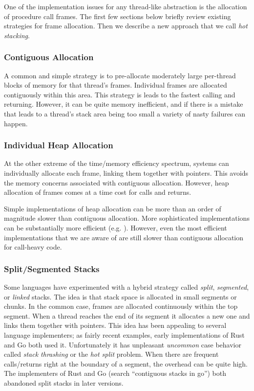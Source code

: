 \documentclass[acmsmall,anonymous,review]{acmart}\settopmatter{printfolios=true,printccs=false,printacmref=false}
\begin{document}
One of the implementation issues for any thread-like abstraction is the allocation of procedure call frames.
The first few sections below briefly review existing strategies for frame allocation.
Then we describe a new approach that we call \emph{hot stacking}.

\subsubsection{Contiguous Allocation}

A common and simple strategy is to pre-allocate moderately large per-thread blocks of memory for that thread's frames.
Individual frames are allocated contiguously within this area.
This strategy is leads to the fastest calling and returning.
However, it can be quite memory inefficient, and if there is a mistake that leads to a thread's stack area being too small a variety of nasty failures can happen.

\subsubsection{Individual Heap Allocation}

At the other extreme of the time/memory efficiency spectrum, systems can individually allocate each frame, linking them together with pointers.
This avoids the memory concerns associated with contiguous allocation.
However, heap allocation of frames comes at a time cost for calls and returns.

Simple implementations of heap allocation can be more than an order of magnitude slower than contiguous allocation.
More sophisticated implementations can be substantially more efficient (e.g. \cite{Shao2000}).
However, even the most efficient implementations that we are aware of are still slower than contiguous allocation for call-heavy code.

\subsubsection{Split/Segmented Stacks}

Some languages have experimented with a hybrid strategy called \emph{split}, \emph{segmented}, or \emph{linked} stacks.
The idea is that stack space is allocated in small segments or chunks.
In the common case, frames are allocated continuously within the top segment.
When a thread reaches the end of its segment it allocates a new one and links them together with pointers.
This idea has been appealing to several language implementers; as fairly recent examples, early implementations of Rust and Go both used it.
Unfortunately it has unpleasant \emph{uncommon} case behavior called \emph{stack thrashing} or the \emph{hot split} problem.
When there are frequent calls/returns right at the boundary of a segment, the overhead can be quite high.
The implementers of Rust \cite{Anderson2013} and Go (search ``contiguous stacks in go'') both abandoned split stacks in later versions.
\end{document}
